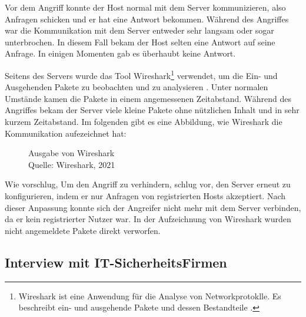Vor dem Angriff konnte der Host normal mit dem Server kommunizieren, also Anfragen schicken und er hat eine Antwort bekommen.
Während des Angriffes war die Kommunikation mit dem Server entweder sehr langsam oder sogar unterbrochen. In diesem Fall
bekam der Host selten eine Antwort auf seine Anfrage. In einigen Momenten gab es überhaubt keine Antwort. 

Seitens des Servers wurde das Tool Wireshark\footnote{Wireshark ist eine Anwendung für die Analyse von Networkprotoklle.
Es beschreibt ein- und ausgehende Pakete und dessen Bestandteile \cite{refst:wisa}.} verwendet, um die Ein- und Ausgehenden
Pakete zu beobachten und zu analysieren \cite{refart:UBEC}. Unter normalen Umstände kamen die Pakete in einem angemessenen
Zeitabstand. Während des Angriffes bekam der Server viele kleine Pakete ohne nützlichen Inhalt und in sehr kurzem Zeitabstand.
Im folgenden gibt es eine Abbildung, wie Wireshark die Kommunikation aufezeichnet hat:

\begin{figure}[H]
  \caption{Ausgabe von Wireshark \\Quelle: Wireshark, 2021}
  \label{fig:refst_wisa}
\end{figure}

Wie \cite{refip:NYRS} vorschlug, Um den Angriff zu verhindern, schlug  \cite{refip:NYRS} vor, den Server erneut zu konfigurieren, indem er nur
Anfragen von registrierten Hosts akzeptiert. Nach dieser Anpassung konnte sich der Angreifer nicht mehr  
mit dem Server verbinden, da er kein registrierter Nutzer war. In der Aufzeichnung von Wireshark wurden nicht 
angemeldete Pakete direkt verworfen.

\subsection{Interview mit IT-SicherheitsFirmen}

